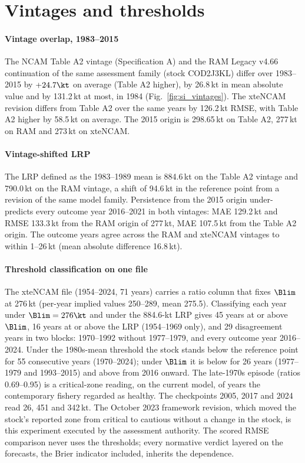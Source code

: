 \FloatBarrier
\section{Vintages and thresholds}\label{si:thresholds}

\paragraph{Vintage overlap, 1983--2015} The NCAM Table A2 vintage (Specification A) and the RAM Legacy v4.66 continuation of the same assessment family (stock COD2J3KL) differ over 1983--2015 by $+24.7\kt$ on average (Table A2 higher), by 26.8\,kt in mean absolute value and by 131.2\,kt at most, in 1984 (Fig.~\ref{fig:si_vintages}). The xteNCAM revision differs from Table A2 over the same years by 126.2\,kt RMSE, with Table A2 higher by 58.5\,kt on average. The 2015 origin is 298.65\,kt on Table A2, 277\,kt on RAM and 273\,kt on xteNCAM.

\paragraph{Vintage-shifted LRP} The LRP defined as the 1983--1989 mean is 884.6\,kt on the Table A2 vintage and 790.0\,kt on the RAM vintage, a shift of 94.6\,kt in the reference point from a revision of the same model family. Persistence from the 2015 origin under-predicts every outcome year 2016--2021 in both vintages: MAE 129.2\,kt and RMSE 133.3\,kt from the RAM origin of 277\,kt, MAE 107.5\,kt from the Table A2 origin. The outcome years agree across the RAM and xteNCAM vintages to within 1--26\,kt (mean absolute difference 16.8\,kt).

\paragraph{Threshold classification on one file} The xteNCAM file (1954--2024, 71 years) carries a ratio column that fixes $\Blim$ at 276\,kt (per-year implied values 250--289, mean 275.5). Classifying each year under $\Blim = 276\kt$ and under the 884.6-kt LRP gives 45 years at or above $\Blim$, 16 years at or above the LRP (1954--1969 only), and 29 disagreement years in two blocks: 1970--1992 without 1977--1979, and every outcome year 2016--2024. Under the 1980s-mean threshold the stock stands below the reference point for 55 consecutive years (1970--2024); under $\Blim$ it is below for 26 years (1977--1979 and 1993--2015) and above from 2016 onward. The late-1970s episode (ratios 0.69--0.95) is a critical-zone reading, on the current model, of years the contemporary fishery regarded as healthy. The checkpoints 2005, 2017 and 2024 read 26, 451 and 342\,kt. The October 2023 framework revision, which moved the stock's reported zone from critical to cautious without a change in the stock, is this experiment executed by the assessment authority. The scored RMSE comparison never uses the thresholds; every normative verdict layered on the forecasts, the Brier indicator included, inherits the dependence.


